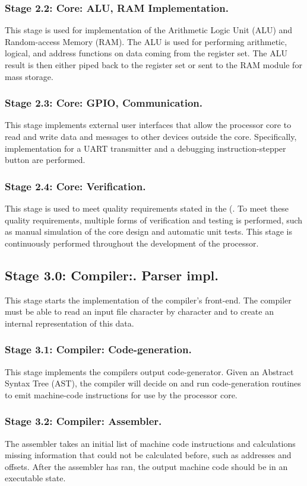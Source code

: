 \documentclass[11pt,a4paper]{report}
\begin{document}
\subsubsection*{Stage 2.2: Core: ALU, RAM Implementation.}
This stage is used for implementation of the Arithmetic Logic Unit (ALU) and Random-access Memory (RAM). The ALU is used for performing arithmetic, logical, and address functions on data coming from the register set. The ALU result is then either piped back to the register set or sent to the RAM module for mass storage.

\subsubsection*{Stage 2.3: Core: GPIO, Communication.}
This stage implements external user interfaces that allow the processor core to read and write data and messages to other devices outside the core. Specifically, implementation for a UART transmitter and a debugging instruction-stepper button are performed.

\subsubsection*{Stage 2.4: Core: Verification.}
This stage is used to meet quality requirements stated in the ({}. To meet these quality requirements, multiple forms of verification and testing is performed, such as manual simulation of the core design and automatic unit tests. This stage is continuously performed throughout the development of the processor.

\subsection*{Stage 3.0: Compiler:. Parser impl.}
This stage starts the implementation of the compiler's front-end. The compiler must be able to read an input file character by character and to create an internal representation of this data.

\subsubsection*{Stage 3.1: Compiler: Code-generation.}
This stage implements the compilers output code-generator. Given an Abstract Syntax Tree (AST), the compiler will decide on and run code-generation routines to emit machine-code instructions for use by the processor core.

\subsubsection*{Stage 3.2: Compiler: Assembler.}
The assembler takes an initial list of machine code instructions and calculations missing information that could not be calculated before, such as addresses and offsets. After the assembler has ran, the output machine code should be in an executable state.
\end{document}
